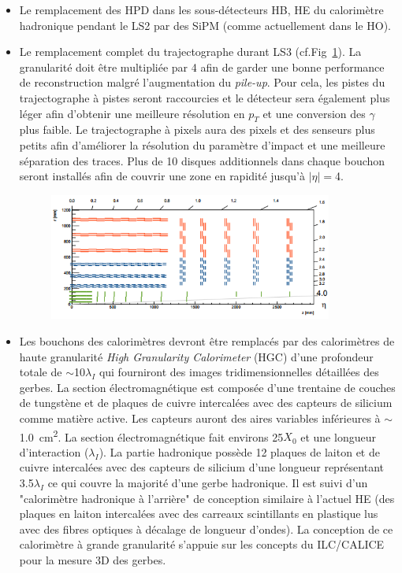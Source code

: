 \begin{itemize}[label=$\bullet$]
	\item Le remplacement des HPD dans les sous-détecteurs HB, HE du calorimètre hadronique pendant le LS2 par des SiPM (comme actuellement dans le HO).
	\item Le remplacement complet du trajectographe durant LS3 (cf.Fig~\ref{tracker2}). La granularité doit être multipliée par \num{4} afin de garder une bonne performance de reconstruction malgré l'augmentation du \textit{pile-up}. Pour cela, les pistes du trajectographe à pistes seront raccourcies et le détecteur sera également plus léger afin d'obtenir une meilleure résolution en $p_{T}$ et une conversion des $\gamma$ plus faible. Le trajectographe à pixels aura des pixels et des senseurs plus petits afin d'améliorer la résolution du paramètre d'impact et une meilleure séparation des traces. Plus de \num{10} disques additionnels dans chaque bouchon seront installés afin de couvrir une zone en rapidité jusqu'à $|\eta|=$\num{4}.
	\begin{figure}[ht!]
		\centering
		\includegraphics[width=0.88\textwidth]{CMS/tracker2.png}
		\label{tracker2}
	\end{figure}
	\item Les bouchons des calorimètres devront être remplacés par des calorimètres de haute granularité \textit{High Granularity Calorimeter} (HGC) d'une profondeur totale de $\sim$\num{10}$\lambda_{I}$ qui fourniront des images tridimensionnelles détaillées des gerbes. La section électromagnétique est composée d'une trentaine de couches de tungstène et de plaques de cuivre intercalées avec des capteurs de silicium comme matière active. Les capteurs auront des aires variables inférieures à $\sim$\SI{1,0}{\square\centi\meter}. La section électromagnétique fait environs \num{25}$X_0$ et une longueur d'interaction ($\lambda_{I}$). La partie hadronique possède \num{12} plaques de laiton et de cuivre intercalées avec des capteurs de silicium d'une longueur représentant \num{3,5}$\lambda_{I}$ ce qui couvre la majorité d'une gerbe hadronique. Il est suivi d'un "calorimètre hadronique à l'arrière" de conception similaire à l'actuel HE (des plaques en laiton intercalées avec des carreaux scintillants en plastique lus avec des fibres optiques à décalage de longueur d'ondes). La conception de ce calorimètre à grande granularité s'appuie sur les concepts du ILC/CALICE pour la mesure 3D des gerbes.

\end{itemize}
